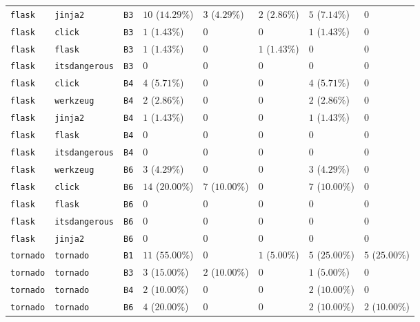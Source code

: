 \begin{table}
\begin{tabular}{llllllll}
\texttt{flask} & \texttt{jinja2} & \texttt{B3} & $10$ ($14.29\%$) & $3$ ($4.29\%$) & $2$ ($2.86\%$) & $5$ ($7.14\%$) & $0$ \\
\texttt{flask} & \texttt{click} & \texttt{B3} & $1$ ($1.43\%$) & $0$ & $0$ & $1$ ($1.43\%$) & $0$ \\
\texttt{flask} & \texttt{flask} & \texttt{B3} & $1$ ($1.43\%$) & $0$ & $1$ ($1.43\%$) & $0$ & $0$ \\
\texttt{flask} & \texttt{itsdangerous} & \texttt{B3} & $0$ & $0$ & $0$ & $0$ & $0$ \\
\texttt{flask} & \texttt{click} & \texttt{B4} & $4$ ($5.71\%$) & $0$ & $0$ & $4$ ($5.71\%$) & $0$ \\
\texttt{flask} & \texttt{werkzeug} & \texttt{B4} & $2$ ($2.86\%$) & $0$ & $0$ & $2$ ($2.86\%$) & $0$ \\
\texttt{flask} & \texttt{jinja2} & \texttt{B4} & $1$ ($1.43\%$) & $0$ & $0$ & $1$ ($1.43\%$) & $0$ \\
\texttt{flask} & \texttt{flask} & \texttt{B4} & $0$ & $0$ & $0$ & $0$ & $0$ \\
\texttt{flask} & \texttt{itsdangerous} & \texttt{B4} & $0$ & $0$ & $0$ & $0$ & $0$ \\
\texttt{flask} & \texttt{werkzeug} & \texttt{B6} & $3$ ($4.29\%$) & $0$ & $0$ & $3$ ($4.29\%$) & $0$ \\
\texttt{flask} & \texttt{click} & \texttt{B6} & $14$ ($20.00\%$) & $7$ ($10.00\%$) & $0$ & $7$ ($10.00\%$) & $0$ \\
\texttt{flask} & \texttt{flask} & \texttt{B6} & $0$ & $0$ & $0$ & $0$ & $0$ \\
\texttt{flask} & \texttt{itsdangerous} & \texttt{B6} & $0$ & $0$ & $0$ & $0$ & $0$ \\
\texttt{flask} & \texttt{jinja2} & \texttt{B6} & $0$ & $0$ & $0$ & $0$ & $0$ \\
\texttt{tornado} & \texttt{tornado} & \texttt{B1} & $11$ ($55.00\%$) & $0$ & $1$ ($5.00\%$) & $5$ ($25.00\%$) & $5$ ($25.00\%$) \\
\texttt{tornado} & \texttt{tornado} & \texttt{B3} & $3$ ($15.00\%$) & $2$ ($10.00\%$) & $0$ & $1$ ($5.00\%$) & $0$ \\
\texttt{tornado} & \texttt{tornado} & \texttt{B4} & $2$ ($10.00\%$) & $0$ & $0$ & $2$ ($10.00\%$) & $0$ \\
\texttt{tornado} & \texttt{tornado} & \texttt{B6} & $4$ ($20.00\%$) & $0$ & $0$ & $2$ ($10.00\%$) & $2$ ($10.00\%$) \\
\bottomrule
\end{tabular}
\end{table}

